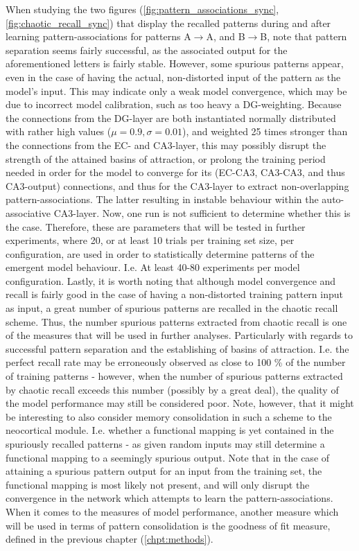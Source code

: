 When studying the two figures (\ref{fig:pattern_associations_sync}, \ref{fig:chaotic_recall_sync}) that display the recalled patterns during and after learning pattern-associations for patterns A$\rightarrow$A, and B$\rightarrow$B, note that pattern separation seems fairly successful, as the associated output for the aforementioned letters is fairly stable. However, some spurious patterns appear, even in the case of having the actual, non-distorted input of the pattern as the model's input. This may indicate only a weak model convergence, which may be due to incorrect model calibration, such as too heavy a DG-weighting. Because the connections from the DG-layer are both instantiated normally distributed with rather high values ($\mu=0.9, \sigma=0.01$), and weighted 25 times stronger than the connections from the EC- and CA3-layer, this may possibly disrupt the strength of the attained basins of attraction, or prolong the training period needed in order for the model to converge for its (EC-CA3, CA3-CA3, and thus CA3-output) connections, and thus for the CA3-layer to extract non-overlapping pattern-associations. The latter resulting in instable behaviour within the auto-associative CA3-layer. Now, one run is not sufficient to determine whether this is the case. Therefore, these are parameters that will be tested in further experiments, where 20, or at least 10 trials per training set size, per configuration, are used in order to statistically determine patterns of the emergent model behaviour. I.e. At least 40-80 experiments per model configuration.
Lastly, it is worth noting that although model convergence and recall is fairly good in the case of having a non-distorted training pattern input as input, a great number of spurious patterns are recalled in the chaotic recall scheme. Thus, the number spurious patterns extracted from chaotic recall is one of the measures that will be used in further analyses. Particularly with regards to successful pattern separation and the establishing of basins of attraction. I.e. the perfect recall rate may be erroneously observed as close to 100 \% of the number of training patterns - however, when the number of spurious patterns extracted by chaotic recall exceeds this number (possibly by a great deal), the quality of the model performance may still be considered poor. Note, however, that it might be interesting to also consider memory consolidation in such a scheme to the neocortical module. I.e. whether a functional mapping is yet contained in the spuriously recalled patterns - as given random inputs may still determine a functional mapping to a seemingly spurious output. Note that in the case of attaining a spurious pattern output for an input from the training set, the functional mapping is most likely not present, and will only disrupt the convergence in the network which attempts to learn the pattern-associations. When it comes to the measures of model performance, another measure which will be used in terms of pattern consolidation is the goodness of fit measure, defined in the previous chapter (\ref{chpt:methods}).

